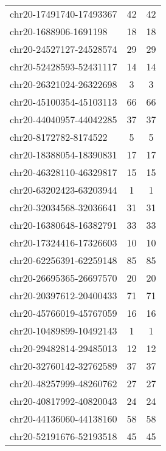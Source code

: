 \begin{longtable}{lSS}
	chr20-17491740-17493367 & 42     & 42                         \\
	chr20-1688906-1691198   & 18     & 18                         \\
	chr20-24527127-24528574 & 29     & 29                         \\
	chr20-52428593-52431117 & 14     & 14                         \\
	chr20-26321024-26322698 & 3      & 3                          \\
	chr20-45100354-45103113 & 66     & 66                         \\
	chr20-44040957-44042285 & 37     & 37                         \\
	chr20-8172782-8174522   & 5      & 5                          \\
	chr20-18388054-18390831 & 17     & 17                         \\
	chr20-46328110-46329817 & 15     & 15                         \\
	chr20-63202423-63203944 & 1      & 1                          \\
	chr20-32034568-32036641 & 31     & 31                         \\
	chr20-16380648-16382791 & 33     & 33                         \\
	chr20-17324416-17326603 & 10     & 10                         \\
	chr20-62256391-62259148 & 85     & 85                         \\
	chr20-26695365-26697570 & 20     & 20                         \\
	chr20-20397612-20400433 & 71     & 71                         \\
	chr20-45766019-45767059 & 16     & 16                         \\
	chr20-10489899-10492143 & 1      & 1                          \\
	chr20-29482814-29485013 & 12     & 12                         \\
	chr20-32760142-32762589 & 37     & 37                         \\
	chr20-48257999-48260762 & 27     & 27                         \\
	chr20-40817992-40820043 & 24     & 24                         \\
	chr20-44136060-44138160 & 58     & 58                         \\
	chr20-52191676-52193518 & 45     & 45                         \\

\end{longtable}
